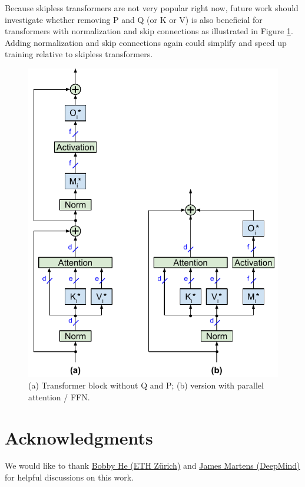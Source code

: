 \documentclass{article}
\begin{document}
Because skipless transformers are not very popular right now, future work should investigate whether removing P and Q (or K or V) is also beneficial for transformers with normalization and skip connections as illustrated in Figure \ref{fig4}. Adding normalization and skip connections again could simplify and speed up training relative to skipless transformers.

\begin{figure} \centering
  \includegraphics[scale=0.92]{../doc/fig/removeWeights_fig4.pdf}
  \caption{(a) Transformer block without Q and P; (b) version with parallel attention / FFN.}
\label{fig4} \end{figure}

\section*{Acknowledgments}
We would like to thank \href{https://scholar.google.com/citations?user=HKft_LAAAAAJ&hl=en}{Bobby He (ETH Zürich)} and \href{https://scholar.google.com/citations?user=LlK_saMAAAAJ&hl=en}{James Martens (DeepMind)} for helpful discussions on this work.



\end{document}
